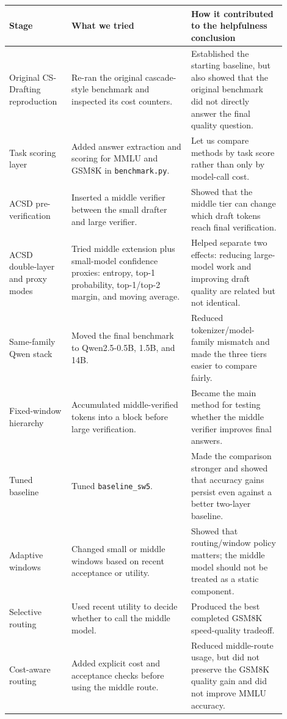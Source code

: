 \documentclass[11pt]{article}
\begin{document}
\begin{longtable}{p{0.20\linewidth}p{0.39\linewidth}p{0.31\linewidth}}
\toprule
Stage & What we tried & How it contributed to the helpfulness conclusion \\
\midrule
\endhead
Original CS-Drafting reproduction & Re-ran the original cascade-style benchmark and inspected its cost counters. & Established the starting baseline, but also showed that the original benchmark did not directly answer the final quality question. \\
Task scoring layer & Added answer extraction and scoring for MMLU and GSM8K in \texttt{benchmark.py}. & Let us compare methods by task score rather than only by model-call cost. \\
ACSD pre-verification & Inserted a middle verifier between the small drafter and large verifier. & Showed that the middle tier can change which draft tokens reach final verification. \\
ACSD double-layer and proxy modes & Tried middle extension plus small-model confidence proxies: entropy, top-1 probability, top-1/top-2 margin, and moving average. & Helped separate two effects: reducing large-model work and improving draft quality are related but not identical. \\
Same-family Qwen stack & Moved the final benchmark to Qwen2.5-0.5B, 1.5B, and 14B. & Reduced tokenizer/model-family mismatch and made the three tiers easier to compare fairly. \\
Fixed-window hierarchy & Accumulated middle-verified tokens into a block before large verification. & Became the main method for testing whether the middle verifier improves final answers. \\
Tuned baseline & Tuned \texttt{baseline\_sw5}. & Made the comparison stronger and showed that accuracy gains persist even against a better two-layer baseline. \\
Adaptive windows & Changed small or middle windows based on recent acceptance or utility. & Showed that routing/window policy matters; the middle model should not be treated as a static component. \\
Selective routing & Used recent utility to decide whether to call the middle model. & Produced the best completed GSM8K speed-quality tradeoff. \\
Cost-aware routing & Added explicit cost and acceptance checks before using the middle route. & Reduced middle-route usage, but did not preserve the GSM8K quality gain and did not improve MMLU accuracy. \\

\end{longtable}
\end{document}
